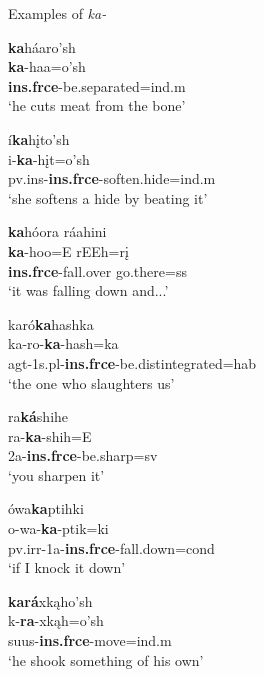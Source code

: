 \begin{exe}
\item\label{kaexamples} Examples of \textit{ka-}

	\begin{xlist}
	
	\item \glll \textbf{ka}háaro'sh\\
	\textbf{ka}-haa=o'sh\\
	\textbf{ins.frce}-\textnormal{be.separated}=ind.m\\
	\glt `he cuts meat from the bone' \citep[68]{hollow1970}
	
	\item \glll í\textbf{ka}hįto'sh\\
	i-\textbf{ka}-hįt=o'sh\\
	pv.ins-\textbf{ins.frce}-\textnormal{soften.hide}=ind.m\\
	\glt `she softens a hide by beating it' \citep[77]{hollow1970}
	
	\item \glll \textbf{ka}hóora ráahini\\
	\textbf{ka}-hoo=E rEEh=rį\\
	\textbf{ins.frce}-\textnormal{fall.over} \textnormal{go.there}=ss\\
	\glt `it was falling down and...' \citep[1]{hollow1973a}
	
	\item \glll karó\textbf{ka}hashka\\
	ka-ro-\textbf{ka}-hash=ka\\
	agt-1s.pl-\textbf{ins.frce}-\textnormal{be.distintegrated}=hab\\
	\glt `the one who slaughters us' \citep[146]{hollow1973a}
	
	\item \glll ra\textbf{ká}shihe\\
	ra-\textbf{ka}-shih=E\\
	2a-\textbf{ins.frce}-\textnormal{be.sharp}=sv\\
	\glt `you sharpen it' \citep[189]{hollow1973a}

	\item \glll ówa\textbf{ka}ptihki\\
	o-wa-\textbf{ka}-ptik=ki\\
	pv.irr-1a-\textbf{ins.frce}-\textnormal{fall.down}=cond\\
	\glt `if I knock it down' \citep[65]{hollow1973a}

	\item \glll \textbf{kará}xkąho'sh\\
	k-\textbf{ra}-xkąh=o'sh\\
	suus-\textbf{ins.frce}-\textnormal{move}=ind.m\\
	\glt `he shook something of his own' \citep[448]{hollow1970}
	
	\end{xlist}

\end{exe}

